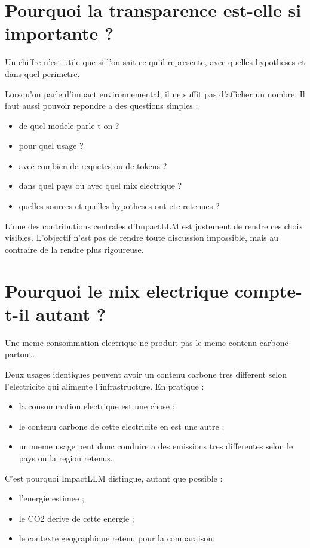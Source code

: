 \documentclass[11pt,a4paper]{article}
\newcommand{\sectionlead}[1]{%
  \noindent\colorbox{emotiaLightBlue}{%
    \parbox{\dimexpr\textwidth-2\fboxsep}{\small #1}%
  }\par
  \vspace{0.45em}
}
\begin{document}
\section{Pourquoi la transparence est-elle si importante ?}
\sectionlead{Un chiffre n'est utile que si l'on sait ce qu'il represente, avec quelles hypotheses et dans quel perimetre.}

Lorsqu'on parle d'impact environnemental, il ne suffit pas d'afficher un nombre. Il faut aussi pouvoir repondre a des questions simples :
\begin{itemize}
  \item de quel modele parle-t-on ?
  \item pour quel usage ?
  \item avec combien de requetes ou de tokens ?
  \item dans quel pays ou avec quel mix electrique ?
  \item quelles sources et quelles hypotheses ont ete retenues ?
\end{itemize}

L'une des contributions centrales d'ImpactLLM est justement de rendre ces choix visibles. L'objectif n'est pas de rendre toute discussion impossible, mais au contraire de la rendre plus rigoureuse.

\section{Pourquoi le mix electrique compte-t-il autant ?}
\sectionlead{Une meme consommation electrique ne produit pas le meme contenu carbone partout.}

Deux usages identiques peuvent avoir un contenu carbone tres different selon l'electricite qui alimente l'infrastructure. En pratique :
\begin{itemize}
  \item la consommation electrique est une chose ;
  \item le contenu carbone de cette electricite en est une autre ;
  \item un meme usage peut donc conduire a des emissions tres differentes selon le pays ou la region retenus.
\end{itemize}

C'est pourquoi ImpactLLM distingue, autant que possible :
\begin{itemize}
  \item l'energie estimee ;
  \item le CO2 derive de cette energie ;
  \item le contexte geographique retenu pour la comparaison.
\end{itemize}
\end{document}
